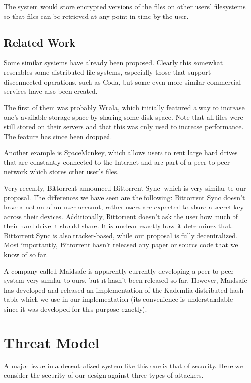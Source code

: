 \documentclass{acm_proc_article-sp}
\begin{document}
The system would store encrypted versions of the files on other users' filesystems so that files can be retrieved at any point in time by the user.

\subsection{Related Work}

Some similar systems have already been proposed. Clearly this somewhat resembles some distributed file systems, especially those that support disconnected operations, such as Coda\cite{coda}, but some even more similar commercial services have also been created.

The first of them was probably Wuala\cite{wuala:measurement}, which initially featured a way to increase one's available storage space by sharing some disk space. Note that all files were still stored on their servers and that this was only used to increase performance. The feature has since been dropped.

Another example is SpaceMonkey\cite{spacemonkey}, which allows users to rent large hard drives that are constantly connected to the Internet and are part of a peer-to-peer network which stores other user's files.

Very recently, Bittorrent announced Bittorrent Sync\cite{sync}, which is very similar to our proposal. The differences we have seen are the following: Bittorrent Sync doesn't have a notion of an user account, rather users are expected to share a secret key across their devices. Additionally, Bittorrent doesn't ask the user how much of their hard drive it should share. It is unclear exactly how it determines that. Bittorrent Sync is also tracker-based, while our proposal is fully decentralized. Most importantly, Bittorrent hasn't released any paper or source code that we know of so far.

A company called Maidsafe is apparently currently developing a peer-to-peer system very similar to ours, but it hasn't been released so far. However, Maidsafe has developed and released an implementation of the Kademlia distributed hash table which we use in our implementation (its convenience is understandable since it was developed for this purpose exactly).

\section{Threat Model}

A major issue in a decentralized system like this one is that of security. Here we consider the security of our design against three types of attackers.
\end{document}
